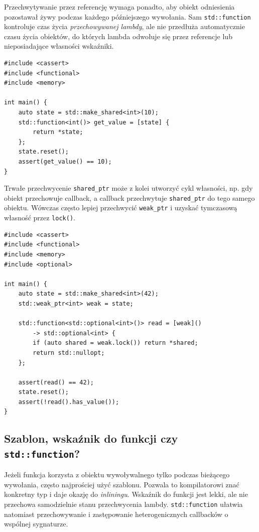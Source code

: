 Przechwytywanie przez referencję wymaga ponadto, aby obiekt odniesienia
pozostawał żywy podczas każdego późniejszego wywołania. Sam
\texttt{std::function} kontroluje czas życia \emph{przechowywanej lambdy},
ale nie przedłuża automatycznie czasu życia obiektów, do których lambda
odwołuje się przez referencje lub nieposiadające własności wskaźniki.

\begin{lstlisting}[caption={Callback utrzymujący obiekt przy życiu przez \texttt{shared\_ptr}; kompletny program.}]
#include <cassert>
#include <functional>
#include <memory>

int main() {
    auto state = std::make_shared<int>(10);
    std::function<int()> get_value = [state] {
        return *state;
    };
    state.reset();
    assert(get_value() == 10);
}
\end{lstlisting}

Trwałe przechwycenie \texttt{shared\_ptr} może z kolei utworzyć cykl
własności, np. gdy obiekt przechowuje callback, a callback przechwytuje
\texttt{shared\_ptr} do tego samego obiektu. Wówczas często lepiej
przechwycić \texttt{weak\_ptr} i uzyskać tymczasową własność przez
\texttt{lock()}.

\begin{lstlisting}[caption={Callback niewymuszający przedłużania życia obiektu; kompletny program.}]
#include <cassert>
#include <functional>
#include <memory>
#include <optional>

int main() {
    auto state = std::make_shared<int>(42);
    std::weak_ptr<int> weak = state;

    std::function<std::optional<int>()> read = [weak]()
        -> std::optional<int> {
        if (auto shared = weak.lock()) return *shared;
        return std::nullopt;
    };

    assert(read() == 42);
    state.reset();
    assert(!read().has_value());
}
\end{lstlisting}

\subsection{Szablon, wskaźnik do funkcji czy \texttt{std::function}?}

Jeżeli funkcja korzysta z obiektu wywoływalnego tylko podczas bieżącego
wywołania, często najprościej użyć szablonu. Pozwala to kompilatorowi
znać konkretny typ i daje okazję do \emph{inliningu}. Wskaźnik do funkcji
jest lekki, ale nie przechowa samodzielnie stanu przechwycenia lambdy.
\texttt{std::function} ułatwia natomiast przechowywanie i zastępowanie
heterogenicznych callbacków o wspólnej sygnaturze.

